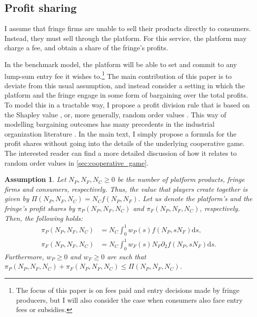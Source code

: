 \documentclass[a4paper]{article}
\newtheorem{assumption}{Assumption}
\newcommand{\ds}{\mathrm{d}s}
\begin{document}
\subsection{Profit sharing}

I assume that fringe firms are unable to sell their products directly to consumers.
Instead, they must sell through the platform.
For this service, the platform may charge a fee, and obtain a share of the fringe's profits.

In the benchmark model, the platform will be able to set and commit to any lump-sum entry fee it wishes to.\footnote{
    The focus of this paper is on fees paid and entry decisions made by fringe producers, but I will also consider the case when consumers also face entry fees or subsidies.
}
The main contribution of this paper is to deviate from this usual assumption, and instead consider a setting in which the platform and the fringe engage in some form of bargaining over the total profits.
To model this in a tractable way, I propose a profit division rule that is based on the Shapley value \parencite{shapley1953additive}, or, more generally, random order values \parencite{weber1988probabilistic}.
This way of modelling bargaining outcomes has many precedents in the industrial organization literature \parencite[e.g.][]{montez2007downstream,hart1990property,levy1997individual,inderst2003bargaining,brugemann2019intra}.
In the main text, I simply propose a formula for the profit shares without going into the details of the underlying cooperative game.
The interested reader can find a more detailed discussion of how it relates to random order values in \cref{sec:cooperative_game}.

\begin{assumption}
    \label{ass:profit_sharing}
    Let $N_P, N_F, N_C \geq 0$ be the number of platform products, fringe firms and consumers, respectively.
    Thus, the value that players create together is given by $\Pi(N_P, N_F, N_C) = N_C f(N_P, N_F)$.
    Let us denote the platform's and the fringe's profit shares by $\pi_P(N_P, N_F, N_C)$ and $\pi_F(N_P, N_F, N_C)$, respectively.
    Then, the following holds:
    \begin{align*}
        \pi_P(N_P, N_F, N_C) &= N_C \int_0^1 w_P(s) f(N_P, s N_F) \ds, \\
        \pi_F(N_P, N_F, N_C) &= N_C \int_0^1 w_F(s) N_F \partial_2 f(N_P, s N_F) \ds.
    \end{align*}
    Furthermore, $w_P \geq 0$ and $w_F \geq 0$ are such that $\pi_P(N_P, N_F, N_C) + \pi_F(N_P, N_F, N_C) \leq \Pi(N_P, N_F, N_C)$.
\end{assumption}
\end{document}
